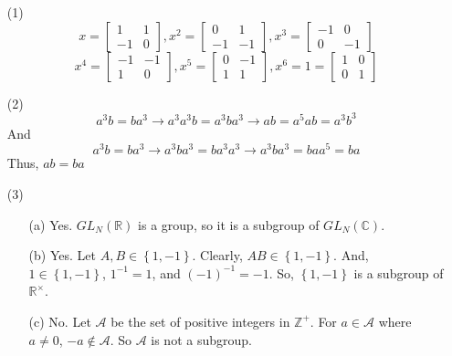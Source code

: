 %
%
\begin{itemize}
\item[(1)]
$$x = \begin{bmatrix}
1 & 1 \\
-1 & 0
\end{bmatrix}, x^2 = \begin{bmatrix}
0 & 1 \\
-1 & -1
\end{bmatrix}, x^3 = \begin{bmatrix}
-1 & 0 \\
0 & -1
\end{bmatrix} $$
$$x^4 = \begin{bmatrix}
-1 & -1 \\
1 & 0
\end{bmatrix}, x^5 = \begin{bmatrix}
0 & -1 \\
1 & 1
\end{bmatrix}, x^6 = 1 = \begin{bmatrix}
1 & 0 \\
0 & 1
\end{bmatrix}$$
\item[(2)]
$$a^3b = ba^3 \rightarrow a^3a^3b = a^3ba^3 \rightarrow ab = a^5ab = a^3b^3$$
And
$$a^3b = ba^3 \rightarrow a^3ba^3 = ba^3a^3 \rightarrow a^3ba^3 = baa^5 = ba$$
Thus, $ab = ba$
\item[(3)]
\begin{itemize}
\item[(a)] Yes. $GL_N(\mathbb{R})$ is a group, so it is a subgroup of $GL_N(\mathbb{C})$.
\item[(b)] Yes. Let $A, B \in \left\lbrace 1, -1 \right\rbrace$. Clearly, $AB \in \left\lbrace 1, -1 \right\rbrace$. And, $1 \in \left\lbrace 1, -1 \right\rbrace$, $1^{-1} = 1$, and $(-1)^{-1} = -1$. So, $\left\lbrace 1, -1 \right\rbrace$ is a subgroup of $\mathbb{R}^\times$.
\item[(c)] No. Let $\mathcal{A}$ be the set of positive integers in $\mathbb{Z}^+$. For $a \in \mathcal{A}$ where $a \neq 0$, $-a \not \in \mathcal{A}$. So $\mathcal{A}$ is not a subgroup.

\end{itemize}
\end{itemize}
